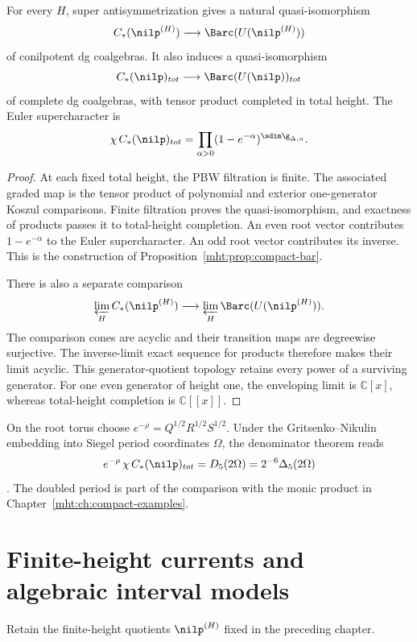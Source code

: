\begin{theorem}
For every $H$, super antisymmetrization gives a natural quasi-isomorphism
\[
 C_*(\nilp^{(H)})\longrightarrow\Barc(U(\nilp^{(H)}))
\]
of conilpotent dg coalgebras.
It also induces a quasi-isomorphism
\[
 \widehat{C_*(\nilp)}_{\mathrm{tot}}
   \longrightarrow\widehat{\Barc(U(\nilp))}_{\mathrm{tot}}
\]
of complete dg coalgebras, with tensor product completed in total height.
The Euler supercharacter is
\[
 \chi\,\widehat{C_*(\nilp)}_{\mathrm{tot}}
   =\prod_{\alpha>0}(1-e^{-\alpha})^{\sdim\g_{\Delta,\alpha}}.
\]
\end{theorem}
\begin{proof}
At each fixed total height, the PBW filtration is finite.
The associated graded map is the tensor product of polynomial and exterior one-generator Koszul comparisons.
Finite filtration proves the quasi-isomorphism, and exactness of products passes it to total-height completion.
An even root vector contributes $1-e^{-\alpha}$ to the Euler supercharacter.
An odd root vector contributes its inverse.
This is the construction of Proposition~\ref{mht:prop:compact-bar}.

There is also a separate comparison
\[
 \varprojlim_H C_*(\nilp^{(H)})
   \longrightarrow\varprojlim_H\Barc(U(\nilp^{(H)})).
\]
The comparison cones are acyclic and their transition maps are degreewise surjective.
The inverse-limit exact sequence for products therefore makes their limit acyclic.
This generator-quotient topology retains every power of a surviving generator.
For one even generator of height one, the enveloping limit is $\mathbb C[x]$, whereas total-height completion is $\mathbb C[[x]]$.
\end{proof}

On the root torus choose $e^{-\rho}=Q^{1/2}R^{1/2}S^{1/2}$.
Under the Gritsenko--Nikulin embedding into Siegel period coordinates $\Omega$, the denominator theorem reads
\[
 e^{-\rho}\,\chi\,\widehat{C_*(\nilp)}_{\mathrm{tot}}
     =D_5(2\Omega)=2^{-6}\Delta_5(2\Omega)
\]
\cite{GN97,GN98b}.
The doubled period is part of the comparison with the monic product in Chapter~\ref{mht:ch:compact-examples}.

\chapter{Finite-height currents and algebraic interval models}
Retain the finite-height quotients $\nilp^{(H)}$ fixed in the preceding chapter.

